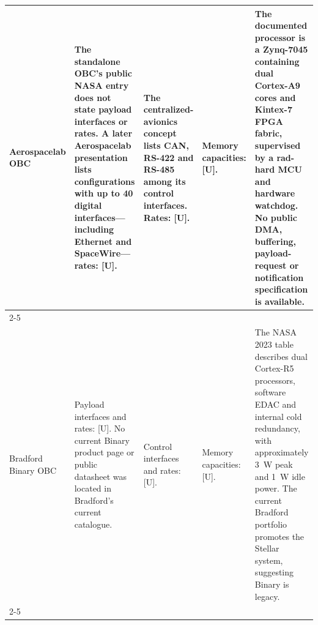 \documentclass[10pt]{../datasheet}
\let\cite\citep
\begin{document}
\begin{landscape}
\begin{longtable}{|p{3.2cm}|p{4.5cm}|p{4.5cm}|p{4.5cm}|p{5.5cm}|}
    Aerospacelab OBC \cite{nasa_soa_2024}                              &
    The standalone OBC's public NASA entry does not state payload interfaces or
    rates. A later Aerospacelab presentation lists configurations with up to 40
    digital interfaces---including Ethernet and SpaceWire---rates: [U].
                                                                       & The centralized-avionics concept lists CAN, RS-422 and RS-485 among its
    control interfaces. Rates: [U].
                                                                       & Memory capacities: [U].
                                                                       & The documented processor is a Zynq-7045 containing dual Cortex-A9 cores
    and Kintex-7 FPGA fabric, supervised by a rad-hard MCU and hardware
    watchdog. No public DMA, buffering, payload-request or notification
    specification is available.
    \\
    \cline{2-5}
                                                                       &                                                                            &                                                  &                                           & \\ \hline\hline

    Bradford Binary OBC \cite{nasa_soa_2023}                           &
    Payload interfaces and rates: [U]. No current Binary product page or public
    datasheet was located in Bradford's current catalogue.
                                                                       & Control interfaces and rates: [U].
                                                                       & Memory capacities: [U].
                                                                       & The NASA 2023 table describes dual Cortex-R5 processors, software EDAC and
    internal cold redundancy, with approximately 3~W peak and 1~W idle power.
    The current Bradford portfolio promotes the Stellar system, suggesting
    Binary is legacy.
    \\
    \cline{2-5}
                                                                       &                                                                            &                                                  &                                           & \\ \hline\hline


\end{longtable}
\end{landscape}
\end{document}
